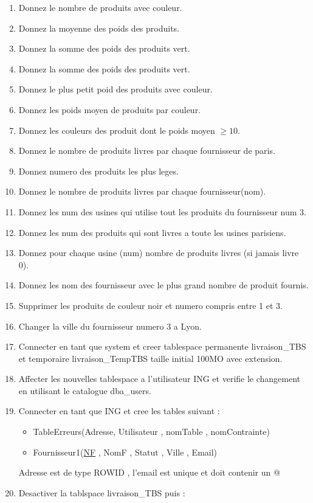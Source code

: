 \documentclass{article}
\begin{document}
\begin{enumerate}
\item Donnez le nombre de produits avec couleur.
\item Donnez la moyenne des poids des produits.
\item Donnez la somme des poids des produits vert.
\item Donnez la somme des poids des produits vert.
\item Donnez le plus petit poid des produits avec couleur.
\item Donnez les poids moyen de produits par couleur. 
\item Donnez les couleurs des produit dont le poids moyen \(\geq 10\). 
\item Donnez le nombre de produits livres par chaque fournisseur de paris.
\item Donnez numero des produits les plus leges.
\item Donnez le nombre de produits livres par chaque fournisseur(nom).
\item Donnez les num des usines qui utilise tout les produits du fournisseur num 3.
\item Donnez les num des produits qui sont livres a toute les usines parisiens.
\item Donnez pour chaque usine (num) nombre de produits livres (si jamais livre 0).
\item Donnez les nom des fournisseur avec le plus grand nombre de produit fournis.
\item Supprimer les produits de couleur noir et numero compris entre 1 et 3.
\item Changer la ville du fournisseur numero 3 a Lyon.
\item Connecter en tant que system et creer tablespace permanente livraison\_TBS et temporaire livraison\_TempTBS taille initial 100MO avec extension.
\item Affecter les nouvelles tablespace a l'utilisateur ING et verifie le changement en utilisant le catalogue dba\_users.
\item Connecter en tant que ING et cree les tables suivant :
\begin{itemize}
    \item TableErreurs(Adresse, Utilisateur , nomTable , nomContrainte)
    \item Fournisseur1(\underline{NF} , NomF , Statut , Ville , Email) 
\end{itemize}
Adresse est de type ROWID , l'email est unique et doit contenir un @
\item Desactiver la tablspace livraison\_TBS puis : 

\end{enumerate}
\end{document}
